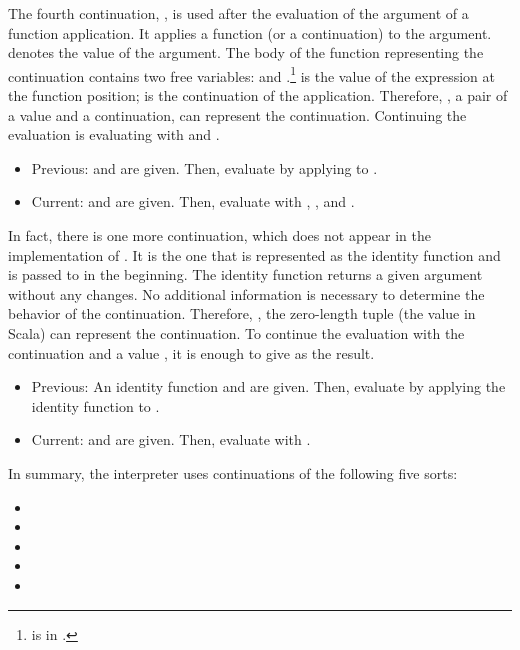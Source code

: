 The fourth continuation, , is used after the
evaluation of the argument of a function application. It applies a function (or
a continuation) to the argument.
 denotes the value of the argument. The body of the function
representing the continuation contains two free variables:  and
.\footnote{ is in .}
 is the value of the expression at the function position;
 is the continuation of the application. Therefore, ,
a pair of a value and a continuation, can represent
the continuation. Continuing the evaluation is evaluating 
with  and .

\begin{itemize}
  \item Previous:  and  are given. Then, evaluate
   by applying  to .
  \item Current:  and  are given. Then, evaluate  with , , and .
\end{itemize}

In fact, there is one more continuation, which does not appear in the implementation of
. It is the one that is represented as the identity function and is
passed to  in the beginning. The identity function returns a given
argument without any changes. No additional information is necessary to determine the
behavior of the continuation. Therefore, \code{()}, the zero-length tuple (the
 value in Scala) can represent the continuation. To continue the
evaluation with the continuation and a value , it is enough to give
 as the result.

\begin{itemize}
  \item Previous: An identity function and  are given. Then, evaluate 
  by applying the identity function to .
  \item Current: \code{()} and  are given. Then, evaluate  with
  .
\end{itemize}

In summary, the \Lang interpreter uses continuations of the following five
sorts:

\begin{itemize}
  \item {}
  \item {}
  \item {}
  \item {}
  \item \code{()}
\end{itemize}

